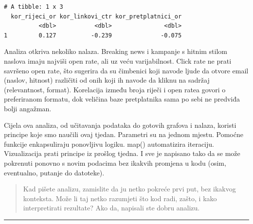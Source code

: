 \documentclass[
  croatian,
  letterpaper,
  DIV=11,
  numbers=noendperiod]{scrartcl}
\begin{document}
\begin{verbatim}
# A tibble: 1 x 3
  kor_rijeci_or kor_linkovi_ctr kor_pretplatnici_or
          <dbl>           <dbl>               <dbl>
1         0.127          -0.239              -0.075
\end{verbatim}

Analiza otkriva nekoliko nalaza. Breaking news i kampanje s hitnim
stilom naslova imaju najviši open rate, ali uz veću varijabilnost. Click
rate ne prati savršeno open rate, što sugerira da su čimbenici koji
navode ljude da otvore email (naslov, hitnost) različiti od onih koji ih
navode da kliknu na sadržaj (relevantnost, format). Korelacija između
broja riječi i open ratea govori o preferiranom formatu, dok veličina
baze pretplatnika sama po sebi ne predviđa bolji angažman.

Cijela ova analiza, od učitavanja podataka do gotovih grafova i nalaza,
koristi principe koje smo naučili ovaj tjedan. Parametri su na jednom
mjestu. Pomoćne funkcije enkapsuliraju ponovljivu logiku. map()
automatizira iteraciju. Vizualizacija prati principe iz prošlog tjedna.
I sve je napisano tako da se može pokrenuti ponovno s novim podacima bez
ikakvih promjena u kodu (osim, eventualno, putanje do datoteke).

\begin{quote}
Kad pišete analizu, zamislite da ju netko pokreće prvi put, bez ikakvog
konteksta. Može li taj netko razumjeti što kod radi, zašto, i kako
interpretirati rezultate? Ako da, napisali ste dobru analizu.
\end{quote}

\begin{center}\rule{0.5\linewidth}{0.5pt}\end{center}
\end{document}
